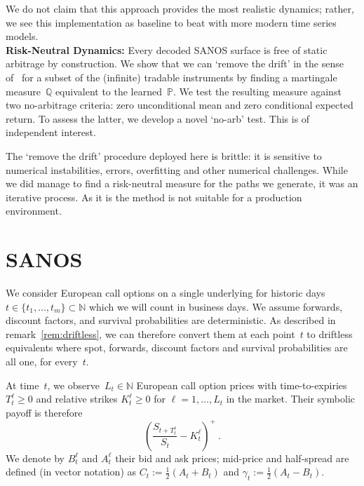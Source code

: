 \documentclass[11pt,a4paper]{article}
\newcommand{\N}{\mathbb{N}}
\newcommand{\Q}{\mathbb{Q}}
\renewcommand{\P}{\mathbb{P}}
\renewcommand{\Q}{\mathbb{Q}}
\begin{document}
    We do not
    claim that this approach provides the most realistic dynamics; rather,
    we see this implementation as baseline to beat with more modern
    time series models.\\

    \noindent
\textbf{Risk-Neutral Dynamics:}
Every decoded SANOS surface is free of static arbitrage by construction.
We show that we can `remove the drift' in the sense of~\citet{removedrift} for a subset of the (infinite) tradable instruments
by finding a martingale measure~$\Q$ equivalent to the learned~$\P$.
We test the resulting measure against two no-arbitrage criteria: zero
unconditional mean and zero conditional expected return. To assess the latter, we develop a novel `no-arb' test.
This is of independent interest.

The `remove the drift' procedure deployed here is brittle: it is sensitive to numerical instabilities,
errors, overfitting and other numerical challenges. While we did manage to find a risk-neutral
measure for the paths we generate, it was an iterative process. As it is the method is not suitable
for a production environment.


\section{SANOS}

\label{sec:markets}


We consider European call options on a single underlying
for historic days $t\in \{t_1,\ldots,t_m\}\subset \N$
which we will count in business days.
We assume forwards, discount factors, and survival probabilities
are deterministic. As described in remark~\ref{rem:driftless},
 we can therefore convert them at each point~$t$ to driftless equivalents
where spot, forwards, discount factors and survival probabilities are all one, for every~$t$.


At time~$t$, we observe~$L_t\in\N$ 
European call option prices with time-to-expiries $T_t^\ell \geq 0$ and
relative strikes $K_t^\ell\geq 0$
for $\ell=1,\ldots,L_t$
in the market. Their symbolic payoff is therefore
$$
   \left(\frac{S_{t+T_t^\ell}}{S_t} - K_t^\ell \right)^+ \ .
$$
We denote by $B_t^{\ell}$ and $A_t^\ell$ their bid and ask prices;
mid-price and half-spread are defined (in vector notation) as
$C_t := \tfrac{1}{2}(A_t + B_t)$ and
$\gamma_t := \tfrac{1}{2}(A_t - B_t)$.
\end{document}
